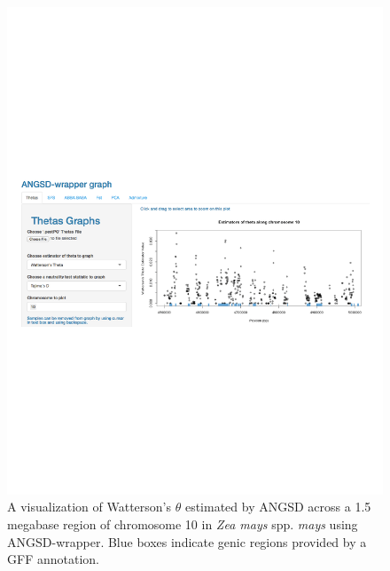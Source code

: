 \documentclass[10pt,a4paper]{article}
\begin{document}
\begin{figure}
\centering
\includegraphics[width=130mm]{figures/fig1.pdf}
\caption{A visualization of Watterson's $\theta$ estimated by ANGSD across a 1.5 megabase region of chromosome 10 in {\it Zea mays} spp. {\it mays} using ANGSD-wrapper. Blue boxes indicate genic regions provided by a GFF annotation. \label{fig:theta} }
\end{figure}
\end{document}
